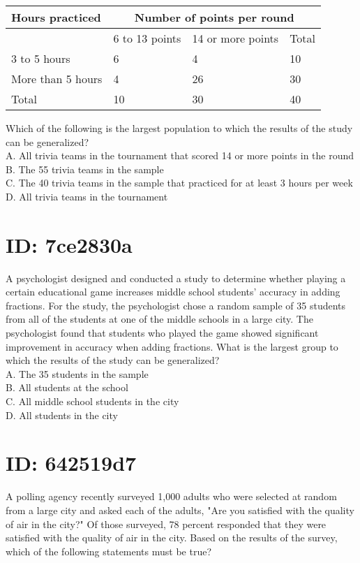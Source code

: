 \begin{center}
\begin{tabular}{|l|l|l|l|}
\hline
\multirow{2}{*}{Hours practiced} & \multicolumn{3}{|c|}{Number of points per round} \\
\hline
 & 6 to 13 points & 14 or more points & Total \\
\hline
3 to 5 hours & 6 & 4 & 10 \\
\hline
More than 5 hours & 4 & 26 & 30 \\
\hline
Total & 10 & 30 & 40 \\
\hline
\end{tabular}
\end{center}

Which of the following is the largest population to which the results of the study can be generalized?\\
A. All trivia teams in the tournament that scored 14 or more points in the round\\
B. The 55 trivia teams in the sample\\
C. The 40 trivia teams in the sample that practiced for at least 3 hours per week\\
D. All trivia teams in the tournament

\section*{ID: 7ce2830a}
A psychologist designed and conducted a study to determine whether playing a certain educational game increases middle school students' accuracy in adding fractions. For the study, the psychologist chose a random sample of 35 students from all of the students at one of the middle schools in a large city. The psychologist found that students who played the game showed significant improvement in accuracy when adding fractions. What is the largest group to which the results of the study can be generalized?\\
A. The 35 students in the sample\\
B. All students at the school\\
C. All middle school students in the city\\
D. All students in the city

\section*{ID: 642519d7}
A polling agency recently surveyed 1,000 adults who were selected at random from a large city and asked each of the adults, "Are you satisfied with the quality of air in the city?" Of those surveyed, 78 percent responded that they were satisfied with the quality of air in the city. Based on the results of the survey, which of the following statements must be true?

